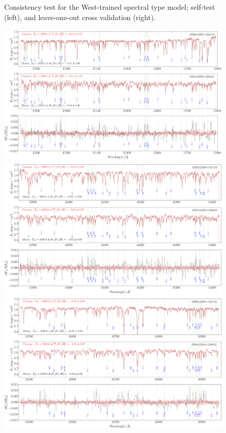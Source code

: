 \documentclass[modern]{aastex62}
\begin{document}
\begin{figure}[ht]
\begin{center}
\end{center}
\caption{Consistency test for the West-trained spectral type model; self-test (left), and leave-one-out cross validation (right).} \label{fig:west_validation}
\end{figure}

\begin{figure}[ht]
\begin{center}
\includegraphics[width=16cm]{figures/demo_derivatives_teff1.png}
\includegraphics[width=16cm]{figures/demo_derivatives_teff2.png}
\includegraphics[width=16cm]{figures/demo_derivatives_teff3.png}

\end{center}
\end{figure}
\end{document}
